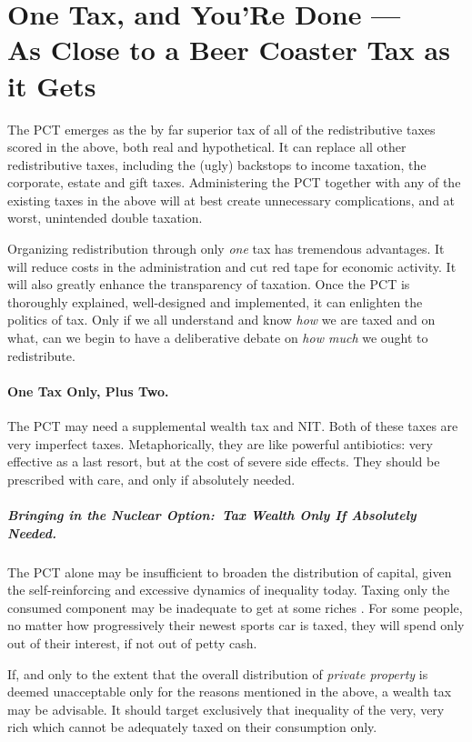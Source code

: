 

\section[One Tax Only]{One Tax, and You'Re Done ---\\As Close to a Beer Coaster Tax as it Gets}
\label{sec:OneTax} The PCT emerges as the by far superior tax of all of the redistributive taxes scored in the above, both real and hypothetical.
It can replace all other redistributive taxes, including the (ugly) backstops to income taxation, the corporate, estate and gift taxes.
Administering the PCT together with any of the existing taxes in the above will at best create unnecessary complications, and at worst, unintended double taxation.

Organizing redistribution through only \emph{one} tax has tremendous advantages.
It will reduce costs in the administration and cut red tape for economic activity.
It will also greatly enhance the transparency of taxation.
Once the PCT is thoroughly explained, well-designed and implemented, it can enlighten the politics of tax.
Only if we all understand and know \emph{how} we are taxed and on what, can we begin to have a deliberative debate on \emph{how much} we ought to redistribute.

\paragraph{One Tax Only, Plus Two.} The PCT may need a supplemental wealth tax and NIT.
Both of these taxes are very imperfect taxes.
Metaphorically, they are like powerful antibiotics:
very effective as a last resort, but at the cost of severe side effects.
They should be prescribed with care, and only if absolutely needed.

\subparagraph{Bringing in the Nuclear Option:~Tax Wealth Only If Absolutely Needed.} The PCT alone may be insufficient to broaden the distribution of capital, given the self-reinforcing and excessive dynamics of inequality today.
Taxing only the consumed component may be inadequate to get at some riches \citep[106]{Shaviro2004}.
For some people, no matter how progressively their newest sports car is taxed, they will spend only out of their interest, if not out of petty cash.

If, and only to the extent that the overall distribution of \emph{private property} is deemed unacceptable only for the reasons mentioned in the above, a wealth tax may be advisable.
It should target exclusively that inequality of the very, very rich which cannot be adequately taxed on their consumption only.

